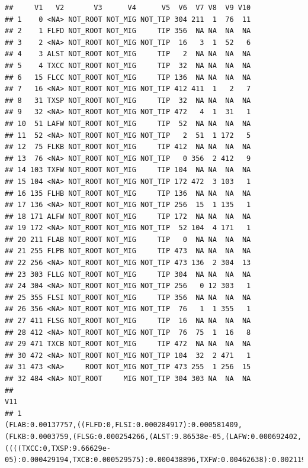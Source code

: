 \documentclass[]{article}
\begin{document}
\begin{verbatim}
##     V1   V2       V3      V4      V5  V6  V7 V8  V9 V10
## 1    0 <NA> NOT_ROOT NOT_MIG NOT_TIP 304 211  1  76  11
## 2    1 FLFD NOT_ROOT NOT_MIG     TIP 356  NA NA  NA  NA
## 3    2 <NA> NOT_ROOT NOT_MIG NOT_TIP  16   3  1  52   6
## 4    3 ALST NOT_ROOT NOT_MIG     TIP   2  NA NA  NA  NA
## 5    4 TXCC NOT_ROOT NOT_MIG     TIP  32  NA NA  NA  NA
## 6   15 FLCC NOT_ROOT NOT_MIG     TIP 136  NA NA  NA  NA
## 7   16 <NA> NOT_ROOT NOT_MIG NOT_TIP 412 411  1   2   7
## 8   31 TXSP NOT_ROOT NOT_MIG     TIP  32  NA NA  NA  NA
## 9   32 <NA> NOT_ROOT NOT_MIG NOT_TIP 472   4  1  31   1
## 10  51 LAFW NOT_ROOT NOT_MIG     TIP  52  NA NA  NA  NA
## 11  52 <NA> NOT_ROOT NOT_MIG NOT_TIP   2  51  1 172   5
## 12  75 FLKB NOT_ROOT NOT_MIG     TIP 412  NA NA  NA  NA
## 13  76 <NA> NOT_ROOT NOT_MIG NOT_TIP   0 356  2 412   9
## 14 103 TXFW NOT_ROOT NOT_MIG     TIP 104  NA NA  NA  NA
## 15 104 <NA> NOT_ROOT NOT_MIG NOT_TIP 172 472  3 103   1
## 16 135 FLHB NOT_ROOT NOT_MIG     TIP 136  NA NA  NA  NA
## 17 136 <NA> NOT_ROOT NOT_MIG NOT_TIP 256  15  1 135   1
## 18 171 ALFW NOT_ROOT NOT_MIG     TIP 172  NA NA  NA  NA
## 19 172 <NA> NOT_ROOT NOT_MIG NOT_TIP  52 104  4 171   1
## 20 211 FLAB NOT_ROOT NOT_MIG     TIP   0  NA NA  NA  NA
## 21 255 FLPB NOT_ROOT NOT_MIG     TIP 473  NA NA  NA  NA
## 22 256 <NA> NOT_ROOT NOT_MIG NOT_TIP 473 136  2 304  13
## 23 303 FLLG NOT_ROOT NOT_MIG     TIP 304  NA NA  NA  NA
## 24 304 <NA> NOT_ROOT NOT_MIG NOT_TIP 256   0 12 303   1
## 25 355 FLSI NOT_ROOT NOT_MIG     TIP 356  NA NA  NA  NA
## 26 356 <NA> NOT_ROOT NOT_MIG NOT_TIP  76   1  1 355   1
## 27 411 FLSG NOT_ROOT NOT_MIG     TIP  16  NA NA  NA  NA
## 28 412 <NA> NOT_ROOT NOT_MIG NOT_TIP  76  75  1  16   8
## 29 471 TXCB NOT_ROOT NOT_MIG     TIP 472  NA NA  NA  NA
## 30 472 <NA> NOT_ROOT NOT_MIG NOT_TIP 104  32  2 471   1
## 31 473 <NA>     ROOT NOT_MIG NOT_TIP 473 255  1 256  15
## 32 484 <NA> NOT_ROOT     MIG NOT_TIP 304 303 NA  NA  NA
##                                                                                                                                                                                                                                                                                                                                                                                                                                  V11
## 1                                                                                             (FLAB:0.00137757,((FLFD:0,FLSI:0.000284917):0.000581409,(FLKB:0.0003759,(FLSG:0.000254266,(ALST:9.86538e-05,(LAFW:0.000692402,((((TXCC:0,TXSP:9.66629e-05):0.000429194,TXCB:0.000529575):0.000438896,TXFW:0.00462638):0.0021191,ALFW:0.000685147):0.000263869):0.00044979):0.00272304):0.000116498):0.000251601):0.00159115):0.0103898

\end{verbatim}
\end{document}
